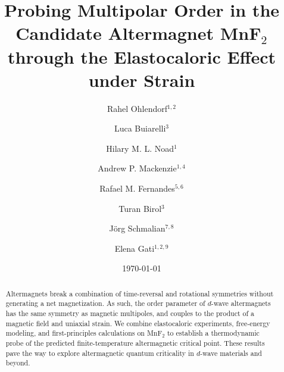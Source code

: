\documentclass[
 reprint,










 amsmath,amssymb,
 aps,






]{revtex4-2}
\begin{document}

\title{Probing Multipolar Order in the Candidate Altermagnet MnF$_2$ through the Elastocaloric Effect under Strain}


\author{Rahel Ohlendorf$^{1,2}$}
\author{Luca Buiarelli$^3$}
\author{Hilary M. L. Noad$^1$}
\author{Andrew P. Mackenzie$^{1,4}$}
\author{Rafael M. Fernandes$^{5,6}$}
\author{Turan Birol$^3$}
\author{Jörg Schmalian$^{7,8}$}
\author{Elena Gati$^{1,2,9}$}


\address{$^{1}$ Max Planck Institute for Chemical Physics of Solids, 01187 Dresden, Germany}
\address{$^{2}$ Institut für Festkörper- und Materialphysik, Technische Universität Dresden, 01062 Dresden, Germany}
\address{$^{3}$ Department of Chemical Engineering and Materials Science,
University of Minnesota, Minneapolis, Minnesota 55455, USA}
\address{$^{4}$ Scottish Universities Physics Alliance, School of Physics and Astronomy, University of St Andrews, St Andrews KY16 9SS, UK}
\address{$^{5}$ Department of Physics, The Grainger College of Engineering,
University of Illinois Urbana-Champaign, Urbana, IL 61801, USA}
\address{$^{6}$ Anthony J. Leggett Institute for Condensed Matter Theory, The Grainger College of Engineering,
University of Illinois Urbana-Champaign, Urbana, IL 61801, USA}
\address{$^{7}$ Institute for Theory of Condensed Matter, Karlsruhe Institute of Technology, 76131 Karlsruhe, Germany}
\address{$^{8}$ Institute for Quantum Materials and Technologies,
Karlsruhe Institute of Technology, 76126 Karlsruhe, Germany}
\address{$^{9}$ Institute of Physics, Goethe University, 60438 Frankfurt/Main, Germany}



\date{\today}

\begin{abstract}
Altermagnets break a combination of time-reversal and rotational symmetries without generating a net magnetization. As such, the order parameter of $d$-wave altermagnets has the same symmetry as magnetic multipoles, and couples to the product of a magnetic field and uniaxial strain. We combine elastocaloric experiments, free-energy modeling, and first-principles calculations on MnF$_2$ to establish a thermodynamic probe of the predicted finite-temperature altermagnetic critical point. These results pave the way to explore altermagnetic quantum criticality in $d$-wave materials and beyond.
\end{abstract}
\end{document}
